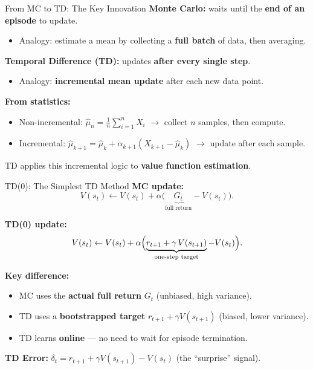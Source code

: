 \documentclass[10pt,english,aspectratio=169]{beamer}
\begin{document}
\begin{frame}{From MC to TD: The Key Innovation}
    \textbf{Monte Carlo:} waits until the \textbf{end of an episode} to update.
    \begin{itemize}
        \item Analogy: estimate a mean by collecting a \textbf{full batch} of data, then averaging.
    \end{itemize}

    \vspace{0.3cm}
    \textbf{Temporal Difference (TD):} updates \textbf{after every single step}.
    \begin{itemize}
        \item Analogy: \textbf{incremental mean update} after each new data point.
    \end{itemize}

    \vspace{0.3cm}
    \textbf{From statistics:}
    \begin{itemize}
        \item Non-incremental: $\hat{\mu}_n = \frac{1}{n}\sum_{i=1}^n X_i$
        \quad $\rightarrow$ collect $n$ samples, then compute.
        \item Incremental: $\hat{\mu}_{k+1} = \hat{\mu}_k + \alpha_{k+1}(X_{k+1} - \hat{\mu}_k)$
        \quad $\rightarrow$ update after each sample.
    \end{itemize}

    \vspace{0.2cm}
    TD applies this incremental logic to \textbf{value function estimation}.
\end{frame}

\begin{frame}{TD(0): The Simplest TD Method}
    \textbf{MC update:}
    \[
        V(s_t) \leftarrow V(s_t) + \alpha \bigl(\underbrace{G_t}_{\text{full return}} - V(s_t)\bigr).
    \]

    \textbf{TD(0) update:}
    \[
        V(s_t) \leftarrow V(s_t) + \alpha \Bigl(\underbrace{r_{t+1} + \gamma\,V(s_{t+1})}_{\text{one-step target}} - V(s_t)\Bigr).
    \]

    \vspace{0.3cm}
    \textbf{Key difference:}
    \begin{itemize}
        \item MC uses the \textbf{actual full return} $G_t$ (unbiased, high variance).
        \item TD uses a \textbf{bootstrapped target} $r_{t+1} + \gamma V(s_{t+1})$ (biased, lower variance).
        \item TD learns \textbf{online} --- no need to wait for episode termination.
    \end{itemize}

    \vspace{0.2cm}
    \textbf{TD Error:} $\delta_t = r_{t+1} + \gamma V(s_{t+1}) - V(s_t)$ \quad (the ``surprise'' signal).
\end{frame}
\end{document}

